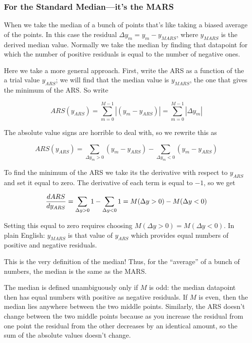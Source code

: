 \documentclass[psfig,preprint]{aastex}
\begin{document}
\subsubsection{ For the Standard Median---it's the MARS}

	When we take the median of a bunch of points that's like taking
a biased average of the points. In this case the residual $\Delta y_m =
y_m - y_{MARS}$, where $y_{MARS}$ is the derived median value. Normally
we take the median by finding that datapoint for which the number of
positive residuals is equal to the number of negative ones. 

	Here we take a more general approach. First, write the ARS as a
function of the a trial value $y_{ARS}$; we will find that the median
value is $y_{MARS}$, the one that gives the minimum of the ARS. So write

\begin{mathletters}
\begin{equation} \label{arsdef1}
ARS(y_{ARS}) = \sum_{m=0}^{M-1}  | (y_m - y_{ARS})|
		 = \sum_{m=0}^{M-1}  | \Delta y_m |
\end{equation}

\noindent The absolute value signs are horrible to deal with, so we
rewrite this as

\begin{equation}
ARS(y_{ARS}) =
        \sum_{\Delta y_m > 0}  ( y_m - y_{ARS})
        - \sum_{\Delta y_m < 0}  ( y_m - y_{ARS})
\end{equation}  
\end{mathletters}

\noindent To find the minimum of the ARS we take its the derivative with
respect to $y_{ARS}$ and set it equal to zero. The derivative of each
term is equal to $-1$, so we get

\begin{equation} \label{expmedian1}
{ d ARS \over dy_{ARS}}= \sum_{\Delta y > 0} 1 
 - \sum_{\Delta y < 0}  1 = M(\Delta y > 0) - M(\Delta y < 0)
\end{equation}  

\noindent Setting this equal to zero requires choosing $M(\Delta y > 0)
= M(\Delta y < 0)$. In plain English: $y_{MARS}$ is that value of
$y_{ARS}$ which provides equal numbers of positive and negative
residuals. 

	This is the very definition of the median! Thus, for the
``average'' of a bunch of numbers, the median is the same as the MARS.

	The median is defined unambiguously only if $M$ is odd: the
median datapoint then has equal numbers with positive as negative
residuals. If $M$ is even, then the median lies anywhere between the two
middle points. Similarly, the ARS doesn't change between the two middle
points because as you increase the residual from one point the residual
from the other decreases by an identical amount, so the sum of the
absolute values doesn't change. 
\end{document}
